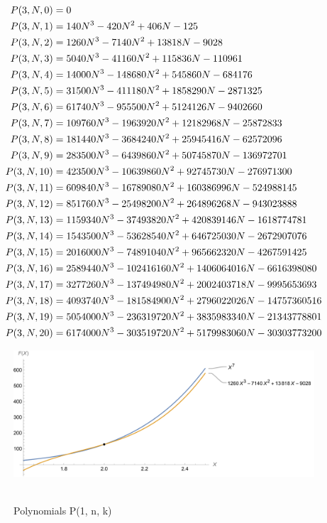 ﻿\begin{align*}
    {P}(3,N,0) &= 0 \\
    {P}(3,N,1) &= 140N^3 - 420N^2 + 406N - 125 \\
    {P}(3,N,2) &= 1260N^3 - 7140N^2 + 13818N - 9028 \\
    {P}(3,N,3) &= 5040N^3 - 41160N^2 + 115836N - 110961 \\
    {P}(3,N,4) &= 14000N^3 - 148680N^2 + 545860N - 684176 \\
    {P}(3,N,5) &= 31500N^3 - 411180N^2 + 1858290N - 2871325 \\
    {P}(3,N,6) &= 61740N^3 - 955500N^2 + 5124126N - 9402660 \\
    {P}(3,N,7) &= 109760N^3 - 1963920N^2 + 12182968N - 25872833 \\
    {P}(3,N,8) &= 181440N^3 - 3684240N^2 + 25945416N - 62572096 \\
    {P}(3,N,9) &= 283500N^3 - 6439860N^2 + 50745870N - 136972701 \\
    {P}(3,N,10) &= 423500N^3 - 10639860N^2 + 92745730N - 276971300 \\
    {P}(3,N,11) &= 609840N^3 - 16789080N^2 + 160386996N - 524988145 \\
    {P}(3,N,12) &= 851760N^3 - 25498200N^2 + 264896268N - 943023888 \\
    {P}(3,N,13) &= 1159340N^3 - 37493820N^2 + 420839146N - 1618774781 \\
    {P}(3,N,14) &= 1543500N^3 - 53628540N^2 + 646725030N - 2672907076 \\
    {P}(3,N,15) &= 2016000N^3 - 74891040N^2 + 965662320N - 4267591425 \\
    {P}(3,N,16) &= 2589440N^3 - 102416160N^2 + 1406064016N - 6616398080 \\
    {P}(3,N,17) &= 3277260N^3 - 137494980N^2 + 2002403718N - 9995653693 \\
    {P}(3,N,18) &= 4093740N^3 - 181584900N^2 + 2796022026N - 14757360516 \\
    {P}(3,N,19) &= 5054000N^3 - 236319720N^2 + 3835983340N - 21343778801 \\
    {P}(3,N,20) &= 6174000N^3 - 303519720N^2 + 5179983060N - 30303773200
\end{align*}

\begin{figure}[H]
    \centering
    \includegraphics[width=1\textwidth]{sections/images/06_seventh_power_with_q_3_n_k}
    ~\caption{Polynomials P(1, n, k)}\label{fig:figure5}
\end{figure}
